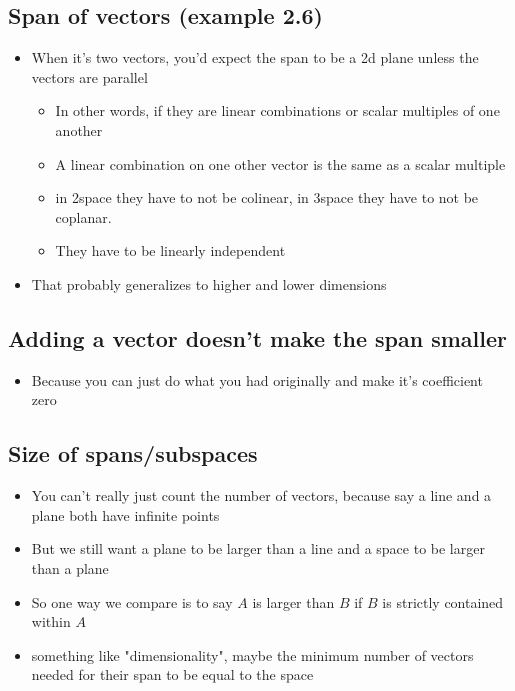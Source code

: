 \documentclass[letterpaper]{article}
\begin{document}
\subsection{Span of vectors (example 2.6)}
\label{sec:orge462e14}
\begin{itemize}
\item When it's two vectors, you'd expect the span to be a 2d plane unless
the vectors are parallel

\begin{itemize}
\item In other words, if they are linear combinations or scalar multiples
of one another
\item A linear combination on one other vector is the same as a scalar
multiple
\item in 2space they have to not be colinear, in 3space they have to not
be coplanar.
\item They have to be linearly independent
\end{itemize}

\item That probably generalizes to higher and lower dimensions
\end{itemize}

\subsection{Adding a vector doesn't make the span smaller}
\label{sec:orgb287fac}
\begin{itemize}
\item Because you can just do what you had originally and make it's
coefficient zero
\end{itemize}

\subsection{Size of spans/subspaces}
\label{sec:org17aa887}
\begin{itemize}
\item You can't really just count the number of vectors, because say a line
and a plane both have infinite points
\item But we still want a plane to be larger than a line and a space to be
larger than a plane
\item So one way we compare is to say \(A\) is larger than \(B\) if \(B\) is
strictly contained within \(A\)
\item something like "dimensionality", maybe the minimum number of vectors
needed for their span to be equal to the space
\end{itemize}
\end{document}
